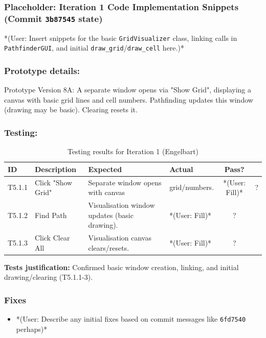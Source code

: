 \newpage
\subsubsection*{Placeholder: Iteration 1 Code Implementation Snippets (Commit \verb|3b87545| state)}
*(User: Insert snippets for the basic \verb|GridVisualizer| class, linking calls in \verb|PathfinderGUI|, and initial \verb|draw_grid|/\verb|draw_cell| here.)*
\newpage

\subsubsection{Prototype details:}
Prototype Version 8A: A separate window opens via "Show Grid", displaying a canvas with basic grid lines and cell numbers. Pathfinding updates this window (drawing may be basic). Clearing resets it.

\subsubsection{Testing:}
\begin{table}[htbp]
	\centering
	\begin{tabularx}{\textwidth}{|l|X|p{4.5cm}|p{1.5cm}|c|}
		\hline
		\textbf{ID} & \textbf{Description} & \textbf{Expected} & \textbf{Actual} & \textbf{Pass?} \\
		\hline
		T5.1.1 & Click "Show Grid" & Separate window opens with canvas & grid/numbers. & *(User: Fill)* & ? \\
		\hline
		T5.1.2 & Find Path & Visualisation window updates (basic drawing). & *(User: Fill)* & ? \\
		\hline
		T5.1.3 & Click Clear All & Visualisation canvas clears/resets. & *(User: Fill)* & ? \\
		\hline
	\end{tabularx}
	\caption{Testing results for Iteration 1 (Engelbart)}
\end{table}
\textbf{Tests justification:} Confirmed basic window creation, linking, and initial drawing/clearing (T5.1.1-3).

\subsubsection{Fixes}
\begin{itemize}
	\item *(User: Describe any initial fixes based on commit messages like \verb|6fd7540| perhaps)*
\end{itemize}

